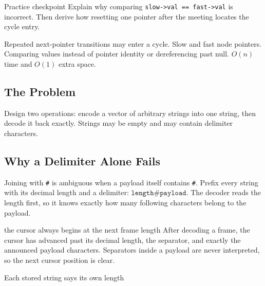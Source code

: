 \begin{revisionbox}{Practice checkpoint}
Explain why comparing \texttt{slow->val == fast->val} is incorrect. Then
derive how resetting one pointer after the meeting locates the cycle entry.
\end{revisionbox}
\chaptercheckpoint
  {Repeated next-pointer transitions may enter a cycle.}
  {Slow and fast node pointers.}
  {Comparing values instead of pointer identity or dereferencing past null.}
  {$O(n)$ time and $O(1)$ extra space.}
\judgeclassnote



\subsection{The Problem}
Design two operations: encode a vector of arbitrary strings into one string,
then decode it back exactly. Strings may be empty and may contain delimiter
characters.

\subsection{Why a Delimiter Alone Fails}
Joining with \texttt{\#} is ambiguous when a payload itself contains
\texttt{\#}. Prefix every string with its decimal length and a delimiter: \(\boxed{\texttt{length\#payload}}.\)
The decoder reads the length first, so it knows exactly how many following
characters belong to the payload.

\begin{invariantbox}{the cursor always begins at the next frame length}
After decoding a frame, the cursor has advanced past its decimal length, the
separator, and exactly the announced payload characters. Separators inside a
payload are never interpreted, so the next cursor position is clear.
\end{invariantbox}

\begin{visualbox}{Each stored string says its own length}
\centering
{}
\end{visualbox}


